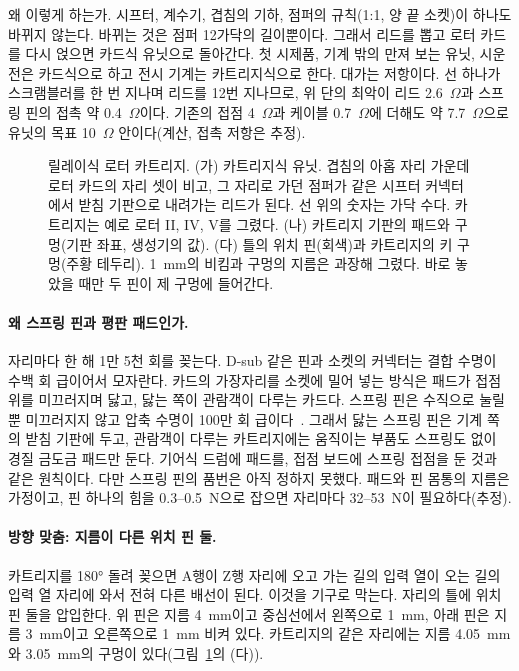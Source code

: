 왜 이렇게 하는가. 시프터, 계수기, 겹침의 기하, 점퍼의 규칙(1:1, 양 끝 소켓)이 하나도 바뀌지 않는다. 바뀌는 것은
점퍼 12가닥의 길이뿐이다. 그래서 리드를 뽑고 로터 카드를 다시 얹으면 카드식 유닛으로 돌아간다. 첫 시제품, 기계
밖의 만져 보는 유닛, 시운전은 카드식으로 하고 전시 기계는 카트리지식으로 한다. 대가는 저항이다. 선 하나가
스크램블러를 한 번 지나며 리드를 12번 지나므로, 위 단의 최악이 리드 2.6~$\Omega$과 스프링 핀의 접촉 약 0.4~$\Omega$이다.
기존의 접점 4~$\Omega$과 케이블 0.7~$\Omega$에 더해도 약 7.7~$\Omega$으로 유닛의 목표 10~$\Omega$ 안이다(계산, 접촉
저항은 추정).

\begin{figure}[ht]
\centering

\caption{릴레이식 로터 카트리지. (가) 카트리지식 유닛. 겹침의 아홉 자리 가운데 로터 카드의 자리 셋이 비고, 그 자리로
가던 점퍼가 같은 시프터 커넥터에서 받침 기판으로 내려가는 리드가 된다. 선 위의 숫자는 가닥 수다. 카트리지는 예로 로터
II, IV, V를 그렸다. (나) 카트리지 기판의 패드와 구멍(기판 좌표, 생성기의 값). (다) 틀의 위치 핀(회색)과 카트리지의 키
구멍(주황 테두리). 1~mm의 비킴과 구멍의 지름은 과장해 그렸다. 바로 놓았을 때만 두 핀이 제 구멍에 들어간다.}
\label{fig:hw-cartridge}
\end{figure}

\paragraph{왜 스프링 핀과 평판 패드인가.} 자리마다 한 해 1만 5천 회를 꽂는다. D-sub 같은 핀과 소켓의 커넥터는
결합 수명이 수백 회 급이어서 모자란다. 카드의 가장자리를 소켓에 밀어 넣는 방식은 패드가 접점 위를 미끄러지며
닳고, 닳는 쪽이 관람객이 다루는 카드다. 스프링 핀은 수직으로 눌릴 뿐 미끄러지지 않고 압축 수명이 100만 회
급이다~\cite{millmax-springpin}. 그래서 닳는 스프링 핀은 기계 쪽의 받침 기판에 두고, 관람객이 다루는 카트리지에는
움직이는 부품도 스프링도 없이 경질 금도금 패드만 둔다. 기어식 드럼에 패드를, 접점 보드에 스프링 접점을 둔 것과
같은 원칙이다. 다만 스프링 핀의 품번은 아직 정하지 못했다. 패드와 핀 몸통의 지름은 가정이고, 핀 하나의 힘을
0.3--0.5~N으로 잡으면 자리마다 32--53~N이 필요하다(추정).

\paragraph{방향 맞춤: 지름이 다른 위치 핀 둘.} 카트리지를 180° 돌려 꽂으면 A행이 Z행 자리에 오고 가는 길의 입력 열이
오는 길의 입력 열 자리에 와서 전혀 다른 배선이 된다. 이것을 기구로 막는다. 자리의 틀에 위치 핀 둘을 압입한다.
위 핀은 지름 4~mm이고 중심선에서 왼쪽으로 1~mm, 아래 핀은 지름 3~mm이고 오른쪽으로 1~mm 비켜 있다. 카트리지의
같은 자리에는 지름 4.05~mm와 3.05~mm의 구멍이 있다(그림~\ref{fig:hw-cartridge}의 (다)).

